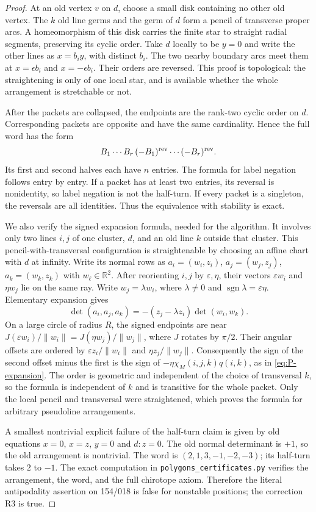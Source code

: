 \begin{proof}
At an old vertex $v$ on $d$, choose a small disk containing no other
old vertex.  The $k$ old line germs and the germ of $d$ form a pencil
of transverse proper arcs.  A homeomorphism of this disk carries
the finite star to straight radial segments, preserving its cyclic
order.  Take $d$ locally to be $y=0$ and write the other lines as
$x=b_i y$, with distinct $b_i$.  The two nearby boundary arcs meet
them at $x=\epsilon b_i$ and $x=-\epsilon b_i$.  Their orders are
reversed.  This proof is topological: the straightening is only of
one local star, and is available whether the whole arrangement is
stretchable or not.

After the packets are collapsed, the endpoints are the rank-two
cyclic order on $d$.  Corresponding packets are opposite and have
the same cardinality.  Hence the full word has the form
\[
       B_1\cdots B_r\,(-B_1)^{\rm rev}\cdots(-B_r)^{\rm rev}.
\]
Its first and second halves each have $n$ entries.  The formula for
label negation follows entry by entry.  If a packet has at least two
entries, its reversal is nonidentity, so label negation is not the
half-turn.  If every packet is a singleton, the reversals are all
identities.  Thus the equivalence with stability is exact.

We also verify the signed expansion formula, needed for the
algorithm.  It involves only two lines $i,j$ of one cluster, $d$,
and an old line $k$ outside that cluster.  This pencil-with-transversal
configuration is straightenable by choosing an affine chart with
$d$ at infinity.  Write its normal rows as $a_i=(w_i,z_i)$,
$a_j=(w_j,z_j)$, $a_k=(w_k,z_k)$ with $w_\ell\in\mathbb R^2$.
After reorienting $i,j$ by $\varepsilon,\eta$, their vectors
$\varepsilon w_i$ and $\eta w_j$ lie on the same ray. Write
$w_j=\lambda w_i$, where $\lambda\ne0$ and
$\operatorname{sgn}\lambda=\varepsilon\eta$. Elementary expansion gives
\[
 \det(a_i,a_j,a_k)=-(z_j-\lambda z_i)\det(w_i,w_k).
\]
On a large circle of radius $R$, the signed endpoints are near
$J(\varepsilon w_i)/\|w_i\|=J(\eta w_j)/\|w_j\|$, where $J$
rotates by $\pi/2$. Their angular offsets are ordered by
$\varepsilon z_i/\|w_i\|$ and $\eta z_j/\|w_j\|$.
Consequently the sign of the second offset minus the first is the sign of
$-\eta\chi_M(i,j,k)q(i,k)$, as in
\eqref{eq:P-expansion}.  The order is geometric and independent of
the choice of transversal $k$, so the formula is independent of $k$
and is transitive for the whole packet.  Only the local pencil and
transversal were straightened, which proves the formula for arbitrary
pseudoline arrangements.

A smallest nontrivial explicit failure of the half-turn claim is
given by old equations $x=0$, $x=z$, $y=0$ and $d:z=0$.  The old
normal determinant is $+1$, so the old arrangement is nontrivial.
The word is $(2,1,3,-1,-2,-3)$; its half-turn takes $2$ to $-1$.
The exact computation in \texttt{polygons\_certificates.py} verifies
the arrangement, the word, and the full chirotope axiom.  Therefore
the literal antipodality assertion on 154/018 is false for
nonstable positions; the correction R3 is true.
\end{proof}

